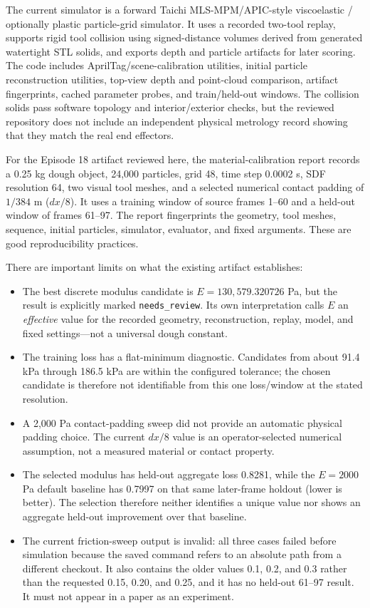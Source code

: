 \documentclass[11pt]{article}
\begin{document}
The current simulator is a forward Taichi MLS-MPM/APIC-style viscoelastic / optionally plastic particle-grid simulator. It uses a recorded two-tool replay, supports rigid tool collision using signed-distance volumes derived from generated watertight STL solids, and exports depth and particle artifacts for later scoring. The code includes AprilTag/scene-calibration utilities, initial particle reconstruction utilities, top-view depth and point-cloud comparison, artifact fingerprints, cached parameter probes, and train/held-out windows. The collision solids pass software topology and interior/exterior checks, but the reviewed repository does not include an independent physical metrology record showing that they match the real end effectors.

For the Episode 18 artifact reviewed here, the material-calibration report records a 0.25 kg dough object, 24,000 particles, grid 48, time step 0.0002 s, SDF resolution 64, two visual tool meshes, and a selected numerical contact padding of $1/384$ m ($dx/8$). It uses a training window of source frames 1--60 and a held-out window of frames 61--97. The report fingerprints the geometry, tool meshes, sequence, initial particles, simulator, evaluator, and fixed arguments. These are good reproducibility practices.

There are important limits on what the existing artifact establishes:

\begin{itemize}[leftmargin=1.45em]
  \item The best discrete modulus candidate is $E=130{,}579.320726$ Pa, but the result is explicitly marked \texttt{needs\_review}. Its own interpretation calls $E$ an \emph{effective} value for the recorded geometry, reconstruction, replay, model, and fixed settings---not a universal dough constant.
  \item The training loss has a flat-minimum diagnostic. Candidates from about 91.4 kPa through 186.5 kPa are within the configured tolerance; the chosen candidate is therefore not identifiable from this one loss/window at the stated resolution.
  \item A 2,000 Pa contact-padding sweep did not provide an automatic physical padding choice. The current $dx/8$ value is an operator-selected numerical assumption, not a measured material or contact property.
  \item The selected modulus has held-out aggregate loss 0.8281, while the $E=2000$ Pa default baseline has 0.7997 on that same later-frame holdout (lower is better). The selection therefore neither identifies a unique value nor shows an aggregate held-out improvement over that baseline.
  \item The current friction-sweep output is invalid: all three cases failed before simulation because the saved command refers to an absolute path from a different checkout. It also contains the older values 0.1, 0.2, and 0.3 rather than the requested 0.15, 0.20, and 0.25, and it has no held-out 61--97 result. It must not appear in a paper as an experiment.
\end{itemize}
\end{document}
